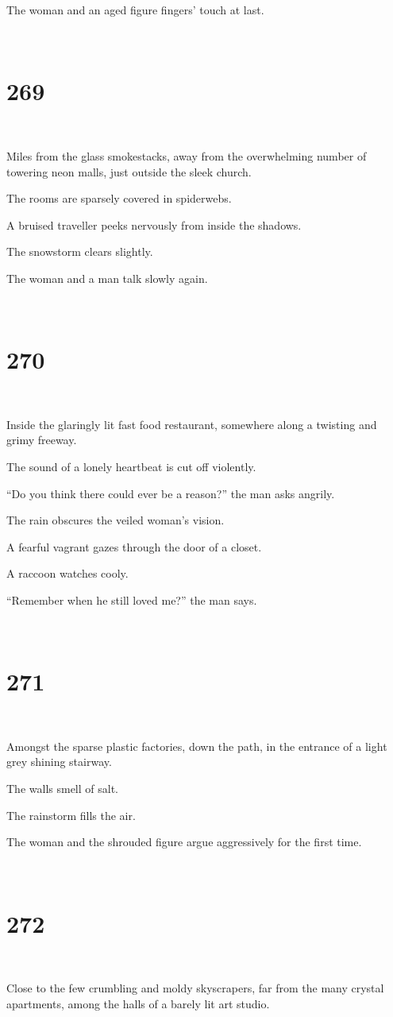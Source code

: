 \documentclass{report}
\begin{document}
The woman and an aged figure fingers' touch at last.

~
\chapter*{269}
~

Miles from the glass smokestacks, away from the overwhelming number of towering neon malls, just outside the sleek church.

The rooms are sparsely covered in spiderwebs.

A bruised traveller peeks nervously from inside the shadows.

The snowstorm clears slightly.

The woman and a man talk slowly again.

~
\chapter*{270}
~

Inside the glaringly lit fast food restaurant, somewhere along a twisting and grimy freeway.

The sound of a lonely heartbeat is cut off violently.

``Do you think there could ever be a reason?'' the man asks angrily.

The rain obscures the veiled woman's vision.

A fearful vagrant gazes through the door of a closet.

A raccoon watches cooly.

``Remember when he still loved me?'' the man says.

~
\chapter*{271}
~

Amongst the sparse plastic factories, down the path, in the entrance of a light grey shining stairway.

The walls smell of salt.

The rainstorm fills the air.

The woman and the shrouded figure argue aggressively for the first time.

~
\chapter*{272}
~

Close to the few crumbling and moldy skyscrapers, far from the many crystal apartments, among the halls of a barely lit art studio.
\end{document}
